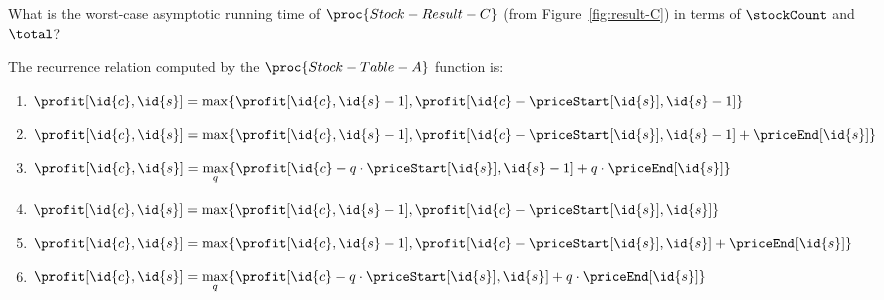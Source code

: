 \documentclass[12pt,twoside]{article}
\newcommand{\answerIIl}{\solution{
1
}}
\newcommand{\answerIIm}{\solution{
7
}}
\newcommand{\answerIIn}{\solution{
5
}}
\begin{document}
\begin{problems}
\begin{problemparts}
\answerIIl
\end{problemparts}

\begin{problemparts}
\problempart
{}
What is the worst-case asymptotic running time of
$\proc{Stock-Result-C}$
(from Figure~\ref{fig:result-C})
in terms of $\stockCount$ and $\total$?
\runtimeAnswers

\answerIIm
\end{problemparts}

\begin{problemparts}

\problempart
{}
The recurrence relation computed
by the $\proc{Stock-Table-A}$ function
is:
\begin{enumerate}
\item $\profit[\id{c}, \id{s}] = \displaystyle\max\{ \profit[\id{c}, \id{s}- 1], \profit[\id{c} - \priceStart[\id{s}], \id{s} - 1] \}$
\item $\profit[\id{c}, \id{s}] = \displaystyle\max\{ \profit[\id{c}, \id{s}- 1], \profit[\id{c} - \priceStart[\id{s}], \id{s} - 1] + \priceEnd[\id{s}]\}$
\item $\profit[\id{c}, \id{s}] = \displaystyle\max_q \{ \profit[\id{c} - q \cdot \priceStart[\id{s}], \id{s} - 1 ]+ q \cdot \priceEnd[\id{s}] \}$
\item $\profit[\id{c}, \id{s}] = \displaystyle\max\{ \profit[\id{c}, \id{s}- 1], \profit[\id{c} - \priceStart[\id{s}], \id{s} ] \}$
\item $\profit[\id{c}, \id{s}] = \displaystyle\max\{ \profit[\id{c}, \id{s}- 1], \profit[\id{c} - \priceStart[\id{s}], \id{s} ]+ \priceEnd[\id{s}] \}$
\item $\profit[\id{c}, \id{s}] = \displaystyle\max_q\{ \profit[\id{c} - q \cdot \priceStart[\id{s}], \id{s} ]+ q \cdot \priceEnd[\id{s}] \}$
\end{enumerate}

\answerIIn


\end{problemparts}
\end{problems}
\end{document}
